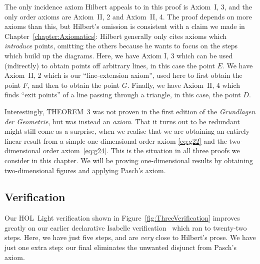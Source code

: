 The only incidence axiom Hilbert appeals to in this proof is Axiom~I, 3, and the only order axioms are Axiom~II, 2 and Axiom~II, 4. The proof depends on more axioms than this, but Hilbert's omission is consistent with a claim we made in Chapter~\ref{chapter:Axiomatics}: Hilbert generally only cites axioms which \emph{introduce} points, omitting the others because he wants to focus on the steps which build up the diagrams. Here, we have Axiom I, 3 which can be used (indirectly) to obtain points off arbitrary lines, in this case the point $E$. We have Axiom~II, 2 which is our ``line-extension axiom'', used here to first obtain the point $F$, and then to obtain the point $G$. Finally, we have Axiom~II, 4 which finds ``exit points'' of a line passing through a triangle, in this case, the point $D$.

Interestingly, THEOREM~3 was not proven in the first edition of the \emph{Grundlagen der Geometrie}, but was instead an \emph{axiom}. That it turns out to be redundant might still come as a surprise, when we realise that we are obtaining an entirely linear result from a simple one-dimensional order axiom \eqref{eq:g22} and the two-dimensional order axiom~\eqref{eq:g24}. This is the situation in all three proofs we consider in this chapter. We will be proving one-dimensional results by obtaining two-dimensional figures and applying Pasch's axiom.

\subsection{Verification}
Our HOL~Light verification shown in Figure~\ref{fig:ThreeVerification} improves greatly on our earlier declarative Isabelle verification~\cite{ScottMScThesis} which ran to twenty-two steps. Here, we have just five steps, and are \emph{very} close to Hilbert's prose. We have just one extra step: our final  eliminates the unwanted disjunct from Pasch's axiom. 

